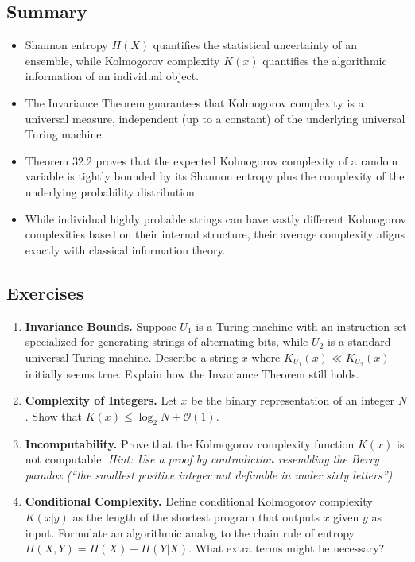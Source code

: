 \subsection*{Summary}
\begin{itemize}
    \item Shannon entropy $H(X)$ quantifies the statistical uncertainty of an ensemble, while Kolmogorov complexity $K(x)$ quantifies the algorithmic information of an individual object.
    \item The Invariance Theorem guarantees that Kolmogorov complexity is a universal measure, independent (up to a constant) of the underlying universal Turing machine.
    \item Theorem 32.2 proves that the expected Kolmogorov complexity of a random variable is tightly bounded by its Shannon entropy plus the complexity of the underlying probability distribution.
    \item While individual highly probable strings can have vastly different Kolmogorov complexities based on their internal structure, their average complexity aligns exactly with classical information theory.
\end{itemize}

\subsection*{Exercises}
\begin{enumerate}
    \item \textbf{Invariance Bounds.} Suppose $U_1$ is a Turing machine with an instruction set specialized for generating strings of alternating bits, while $U_2$ is a standard universal Turing machine. Describe a string $x$ where $K_{U_1}(x) \ll K_{U_2}(x)$ initially seems true. Explain how the Invariance Theorem still holds.
    \item \textbf{Complexity of Integers.} Let $x$ be the binary representation of an integer $N$. Show that $K(x) \le \log_2 N + \mathcal{O}(1)$.
    \item \textbf{Incomputability.} Prove that the Kolmogorov complexity function $K(x)$ is not computable. \textit{Hint: Use a proof by contradiction resembling the Berry paradox (``the smallest positive integer not definable in under sixty letters'').}
    \item \textbf{Conditional Complexity.} Define conditional Kolmogorov complexity $K(x|y)$ as the length of the shortest program that outputs $x$ given $y$ as input. Formulate an algorithmic analog to the chain rule of entropy $H(X, Y) = H(X) + H(Y|X)$. What extra terms might be necessary?
\end{enumerate}

